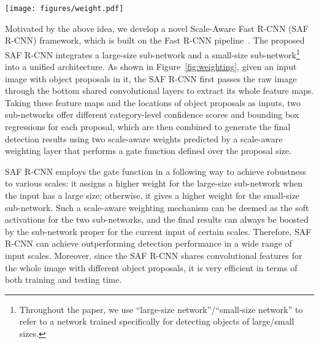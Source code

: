 \documentclass[journal]{IEEEtran}
\begin{document}
\begin{figure*}
	\begin{center}
		\texttt{[image: figures/weight.pdf]}
		\caption{{Illustration of the scale-aware weighting mechanism of our SAF R-CNN. A large-size and a small-size sub-network are learned specifically to detect instances with different sizes. The final result is obtained by fusing the outputs of the two sub-networks according to the object proposal size. Given a large-size object proposal, the weight for the large-size sub-network is high while that for the small-size sub-network is low. In this way, the final result is mainly decided by the large-size network. The situation is the opposite given a small-size object proposal.}}	
		\label{fig:weighting}
	\end{center}
	\vspace{-4mm}
\end{figure*}


Motivated by the above idea, we develop a novel Scale-Aware Fast R-CNN (SAF R-CNN) framework, which is built on the Fast R-CNN pipeline~\cite{girshick2015fast}. The proposed SAF R-CNN integrates a large-size sub-network and a small-size sub-network\footnote{Throughout the paper, we use ``large-size network''/``small-size network'' to refer to a network trained specifically for detecting objects of large/small sizes.} into a unified architecture. As shown in Figure~\ref{fig:weighting}, given an input image with object proposals in it, the SAF R-CNN first passes the raw image through the bottom shared convolutional layers to extract its whole feature maps. Taking these feature maps and the locations of object proposals as inputs, two sub-networks offer different category-level confidence scores and bounding box regressions for each proposal, which are then combined to generate the final detection results using two scale-aware weights predicted by a scale-aware weighting layer that performs a gate function defined over the proposal size. 

SAF R-CNN employs the gate function in a following way to achieve robustness to various scales: it assigns a higher weight for the large-size sub-network when the input has a large size; otherwise, it gives a higher weight  for the small-size sub-network. Such a scale-aware weighting mechanism can be deemed as the soft activations for the two sub-networks, and the final results can always be boosted by the sub-network proper for the current input of certain scales. Therefore, SAF R-CNN can achieve outperforming detection performance in a wide range of input scales. Moreover, since the SAF R-CNN shares convolutional features for the whole image with different object proposals, it is very efficient in terms of both training and testing time.
\end{document}
